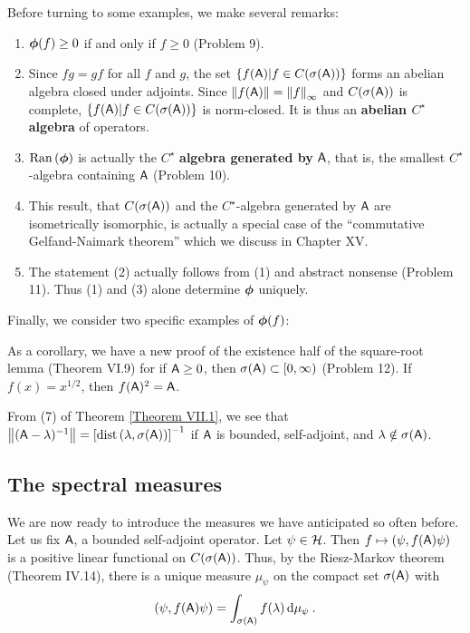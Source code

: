 Before turning to some examples, we make several remarks:
\begin{enumerate}
    \item $\boldsymbol{\phi}(f) \geq 0$ if and only if $f \geq 0$ (Problem 9).
    
    \item Since $fg = gf$ for all $f$ and $g$, the set $\left \lbrace f(\mathsf{A}) | f \in C(\sigma(\mathsf{A})) \right \rbrace$ forms an abelian algebra closed under adjoints. Since $\left \Vert f(\mathsf{A}) \right \Vert = \left \Vert f \right \Vert_\infty$ and $C(\sigma( \mathsf{A}))$ is complete, $\left \lbrace f(\mathsf{A}) | f \in C(\sigma(\mathsf{A})) \right \rbrace$ is norm-closed. It is thus an \textbf{abelian $C^\star$ algebra} of operators. 
    \item $\mathrm{Ran}\, (\boldsymbol{\phi})$ is actually the $C^\star$ \textbf{algebra generated by} $\mathsf{A}$, that is, the smallest $C^\star$-algebra containing $\mathsf{A}$ (Problem 10).
    \item This result, that $C(\sigma (\mathsf{A}))$ and the $C^\star$-algebra generated by $\mathsf{A}$ are isometrically isomorphic, is actually a special case of the \enquote{commutative Gelfand-Naimark theorem} which we discuss in Chapter XV.
    \item The statement (2) actually follows from (1) and abstract nonsense (Problem 11). Thus (1) and (3) alone determine $\boldsymbol{\phi}$ uniquely.
    
\end{enumerate}

Finally, we consider two specific examples of $\boldsymbol{\phi}(f)$:

\begin{example}
    As a corollary, we have a new proof of the existence half of the square-root lemma (Theorem VI.9) for if $\mathsf{A} \geq 0$, then $\sigma (\mathsf{A}) \subset  [0, \infty)$ (Problem 12). If $f(x) = x^{1/2}$, then $f(\mathsf{A})^2 = \mathsf{A}$.
\end{example}

\begin{example}
    From (7) of Theorem \ref{Theorem VII.1}, we see that $\left \Vert (\mathsf{A} - \lambda)^{-1} \right \Vert = \left[ \mathrm{dist}\, (\lambda, \sigma(\mathsf{A})) \right]^{-1}$ if $\mathsf{A}$ is bounded, self-adjoint, and $\lambda \notin \sigma(\mathsf{A})$.
\end{example}

\subsection{The spectral measures}

We are now ready to introduce the measures we have anticipated so often before. Let us fix $\mathsf{A}$, a bounded self-adjoint operator. Let $\psi \in \mathcal{H}$. 
Then $f \mapsto (\psi, f(\mathsf{A}) \psi)$ is a positive linear functional on $C(\sigma(\mathsf{A}))$. Thus, by the Riesz-Markov theorem (Theorem IV.14), there is a unique measure $\mu_\psi$ on the compact set $\sigma(\mathsf{A})$ with 
\begin{align}
    (\psi, f(\mathsf{A}) \psi) = \int_{\sigma (\mathsf{A})} f(\lambda) \, \mathrm{d} \mu_\psi \:.
\end{align}

